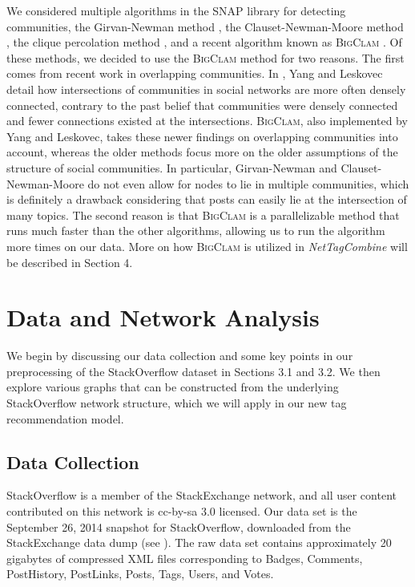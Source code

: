 \documentclass[10pt]{IEEEtran}
\begin{document}
We considered multiple algorithms in the SNAP library for detecting communities, the Girvan-Newman method \cite{4}, the Clauset-Newman-Moore method \cite{5}, the clique percolation method \cite{6}, and a recent algorithm known as \textsc{BigClam} \cite{7}. Of these methods, we decided to use the \textsc{BigClam} method for two reasons. The first comes from recent work in overlapping communities. In \cite{8}, Yang and Leskovec detail how intersections of communities in social networks are more often densely connected, contrary to the past belief that communities were densely connected and fewer connections existed at the intersections. \textsc{BigClam}, also implemented by Yang and Leskovec, takes these newer findings on overlapping communities into account, whereas the older methods focus more on the older assumptions of the structure of social communities. In particular, Girvan-Newman and Clauset-Newman-Moore do not even allow for nodes to lie in multiple communities, which is definitely a drawback considering that posts can easily lie at the intersection of many topics. The second reason is that \textsc{BigClam} is a parallelizable method that runs much faster than the other algorithms, allowing us to run the algorithm more times on our data. More on how \textsc{BigClam} is utilized in \textit{NetTagCombine} will be described in Section 4.

\section{Data and Network Analysis}

We begin by discussing our data collection and some key points in our preprocessing of the StackOverflow dataset in Sections 3.1 and 3.2. We then explore various graphs that can be constructed from the underlying StackOverflow network structure, which we will apply in our new tag recommendation model.

\subsection{Data Collection}

StackOverflow is a member of the StackExchange network, and all user content contributed on this network is cc-by-sa 3.0 licensed. Our data set is the September 26, 2014 snapshot for StackOverflow, downloaded from the StackExchange data dump (see \cite{9}). The raw data set contains approximately 20 gigabytes of compressed XML files corresponding to Badges, Comments, PostHistory, PostLinks, Posts, Tags, Users, and Votes.
\end{document}
